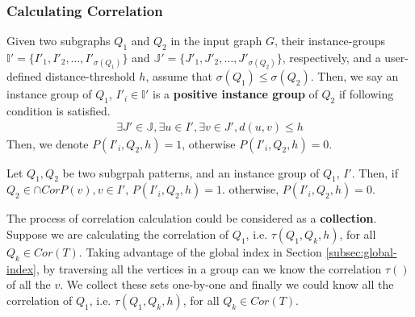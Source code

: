 \subsubsection{Calculating Correlation}\label{subsec:calculating}
\begin{defn}
	Given two subgraphs $Q_1$ and $Q_2$ in the input graph $G$, their instance-groups
	$\mathbb{I'}=\{I'_1,I'_2,\ldots,I'_{\sigma(Q_1)}\}$ and $\mathbb{J'}=\{J'_1,J'_2,\ldots,J'_{\sigma(Q_2)}\}$,
	respectively, and a user-defined distance-threshold $h$, assume that $\sigma(Q_1) \le \sigma(Q_2)$.
	Then, we say an instance group of $Q_1$, $I'_i\in \mathbb{I'}$ is a {\bf positive instance group} of $Q_2$ if following condition is satisfied.
	\begin{align}
		\exists J' \in \mathbb{J}, \exists u \in I', \exists v \in J', d(u,v)\le h
	\end{align}
	Then, we denote $P(I'_i,Q_2,h)=1$, otherwise $P(I'_i,Q_2,h)=0$.
\end{defn}
\begin{thrm}
	Let $Q_1,Q_2$ be two subgrpah patterns, and an instance group of $Q_1$, $I'$. Then,	if $Q_2\in \cap CorP(v),v\in I'$, $P(I'_i,Q_2,h)=1$.
	otherwise, $P(I'_i,Q_2,h)=0$.
\end{thrm}
The process of correlation calculation could be considered as a {\bf collection}. Suppose we are calculating the correlation of $Q_1$, i.e. $\tau(Q_1,Q_k,h)$, for all $Q_k\in Cor(T)$. Taking advantage of the global index in Section \ref{subsec:global-index}, by traversing all the vertices in a group can we know the correlation $\tau()$ of all the $v$. We collect these sets one-by-one and finally we could know all the correlation of $Q_1$, i.e. $\tau(Q_1,Q_k,h)$, for all $Q_k\in Cor(T)$.

